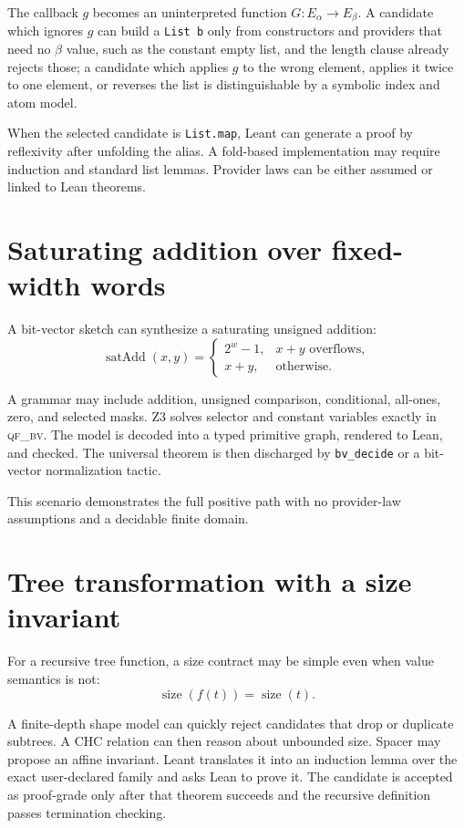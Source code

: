 \documentclass[11pt,oneside]{report}
\newcommand{\QFBV}{\textsc{qf\_bv}\xspace}
\newcommand{\code}[1]{\texttt{#1}}
\begin{document}
The callback $g$ becomes an uninterpreted function $G:E_\alpha\to E_\beta$. A candidate which ignores $g$ can build a \code{List b} only from constructors and providers that need no $\beta$ value, such as the constant empty list, and the length clause already rejects those; a candidate which applies $g$ to the wrong element, applies it twice to one element, or reverses the list is distinguishable by a symbolic index and atom model.

When the selected candidate is \code{List.map}, Leant can generate a proof by reflexivity after unfolding the alias. A fold-based implementation may require induction and standard list lemmas. Provider laws can be either assumed or linked to Lean theorems.

\section{Saturating addition over fixed-width words}
\label{sec:example-saturating}

A bit-vector sketch can synthesize a saturating unsigned addition:
\[
\operatorname{satAdd}(x,y)=
\begin{cases}
2^w-1,&x+y\text{ overflows},\\
x+y,&\text{otherwise}.
\end{cases}
\]

A grammar may include addition, unsigned comparison, conditional, all-ones, zero, and selected masks. Z3 solves selector and constant variables exactly in \QFBV. The model is decoded into a typed primitive graph, rendered to Lean, and checked. The universal theorem is then discharged by \code{bv\_decide} or a bit-vector normalization tactic.

This scenario demonstrates the full positive path with no provider-law assumptions and a decidable finite domain.

\section{Tree transformation with a size invariant}
\label{sec:example-tree}

For a recursive tree function, a size contract may be simple even when value semantics is not:
\[
  \operatorname{size}(f(t))=\operatorname{size}(t).
\]

A finite-depth shape model can quickly reject candidates that drop or duplicate subtrees. A CHC relation can then reason about unbounded size. Spacer may propose an affine invariant. Leant translates it into an induction lemma over the exact user-declared family and asks Lean to prove it. The candidate is accepted as proof-grade only after that theorem succeeds and the recursive definition passes termination checking.
\end{document}
